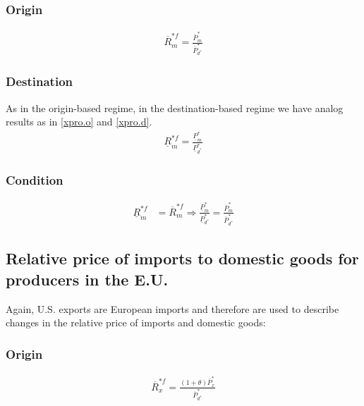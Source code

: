\subsubsection*{Origin}
\begin{equation}\label{mproeu.o}
\begin{aligned}
\overline R^{*f}_m = \frac{\overline P^*_m}{\overline P^*_{d^*}}\end{aligned}  \end{equation}

\subsubsection*{Destination}
As in the origin-based regime, in the destination-based regime we have analog results as in \eqref{xpro.o} and \eqref{xpro.d}.
\begin{equation}\label{mproeu.o}
\begin{aligned}
\underline R^{*f}_m = \frac{\underline P^*_m}{\underline P^*_{d^*}}\end{aligned}  \end{equation}

\subsubsection*{Condition}
\begin{equation}\label{mproeu.con}
\begin{aligned}
    \underline R^{*f}_m &= \overline R^{*f}_m \Rightarrow \frac{\underline P^*_m}{\underline P^*_{d^*}} = \frac{\overline P^*_m}{\overline P^*_{d^*}}
\end{aligned}  \end{equation}

\subsection*{Relative price of imports to domestic goods for producers in the E.U.}
Again, U.S. exports are European imports and therefore are used to describe changes in the relative price of imports and domestic goods:
\subsubsection*{Origin}
\begin{equation}\label{xproeu.o}
\begin{aligned}
\overline R^{*f}_x = \frac{ \left( 1+\theta \right) \overline P^*_x}{\overline P^*_{d^*}}\end{aligned}  \end{equation}

